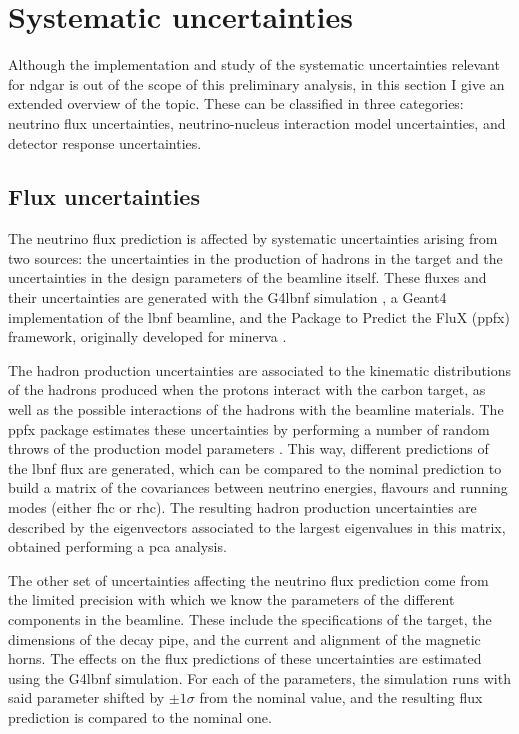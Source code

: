 \section{Systematic uncertainties}
\label{sec:gar_systematics}

Although the implementation and study of the systematic uncertainties relevant for \gls{ndgar} is out of the scope of this preliminary analysis, in this section I give an extended overview of the topic. These can be classified in three categories: neutrino flux uncertainties, neutrino-nucleus interaction model uncertainties, and detector response uncertainties.

\subsection{Flux uncertainties}

The neutrino flux prediction is affected by systematic uncertainties arising from two sources: the uncertainties in the production of hadrons in the target and the uncertainties in the design parameters of the beamline itself. These fluxes and their uncertainties are generated with the G4\gls{lbnf} simulation \cite{DUNE2020TDR2}, a Geant4 implementation of the \gls{lbnf} beamline, and the Package to Predict the FluX (\gls{ppfx}) framework, originally developed for \gls{minerva} \cite{MINERvA2016a}.

The hadron production uncertainties are associated to the kinematic distributions of the hadrons produced when the protons interact with the carbon target, as well as the possible interactions of the hadrons with the beamline materials. The \gls{ppfx} package estimates these uncertainties by performing a number of random throws of the production model parameters \cite{MINERvA2016a}. This way, different predictions of the \gls{lbnf} flux are generated, which can be compared to the nominal prediction to build a matrix of the covariances between neutrino energies, flavours and running modes (either \gls{fhc} or \gls{rhc}). The resulting hadron production uncertainties are described by the eigenvectors associated to the largest eigenvalues in this matrix, obtained performing a \gls{pca} analysis.

The other set of uncertainties affecting the neutrino flux prediction come from the limited precision with which we know the parameters of the different components in the beamline. These include the specifications of the target, the dimensions of the decay pipe, and the current and alignment of the magnetic horns. The effects on the flux predictions of these uncertainties are estimated using the G4\gls{lbnf} simulation. For each of the parameters, the simulation runs with said parameter shifted by $\pm 1\sigma$ from the nominal value, and the resulting flux prediction is compared to the nominal one.

